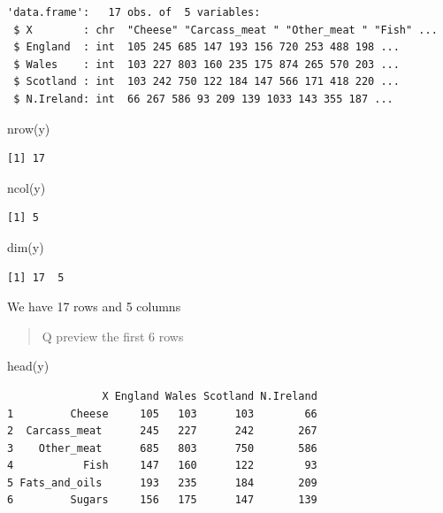 \documentclass[
  letterpaper,
  DIV=11,
  numbers=noendperiod]{scrartcl}
\newenvironment{Shaded}{\begin{snugshade}}{\end{snugshade}}
\newcommand{\FunctionTok}[1]{\textcolor[rgb]{0.28,0.35,0.67}{#1}}
\newcommand{\NormalTok}[1]{\textcolor[rgb]{0.00,0.23,0.31}{#1}}
\begin{document}
\begin{verbatim}
'data.frame':   17 obs. of  5 variables:
 $ X        : chr  "Cheese" "Carcass_meat " "Other_meat " "Fish" ...
 $ England  : int  105 245 685 147 193 156 720 253 488 198 ...
 $ Wales    : int  103 227 803 160 235 175 874 265 570 203 ...
 $ Scotland : int  103 242 750 122 184 147 566 171 418 220 ...
 $ N.Ireland: int  66 267 586 93 209 139 1033 143 355 187 ...
\end{verbatim}

\begin{Shaded}
\begin{Highlighting}[]
\FunctionTok{nrow}\NormalTok{(y)}
\end{Highlighting}
\end{Shaded}

\begin{verbatim}
[1] 17
\end{verbatim}

\begin{Shaded}
\begin{Highlighting}[]
\FunctionTok{ncol}\NormalTok{(y)}
\end{Highlighting}
\end{Shaded}

\begin{verbatim}
[1] 5
\end{verbatim}

\begin{Shaded}
\begin{Highlighting}[]
\FunctionTok{dim}\NormalTok{(y)}
\end{Highlighting}
\end{Shaded}

\begin{verbatim}
[1] 17  5
\end{verbatim}

We have 17 rows and 5 columns

\begin{quote}
Q preview the first 6 rows
\end{quote}

\begin{Shaded}
\begin{Highlighting}[]
\FunctionTok{head}\NormalTok{(y)}
\end{Highlighting}
\end{Shaded}

\begin{verbatim}
               X England Wales Scotland N.Ireland
1         Cheese     105   103      103        66
2  Carcass_meat      245   227      242       267
3    Other_meat      685   803      750       586
4           Fish     147   160      122        93
5 Fats_and_oils      193   235      184       209
6         Sugars     156   175      147       139
\end{verbatim}
\end{document}
